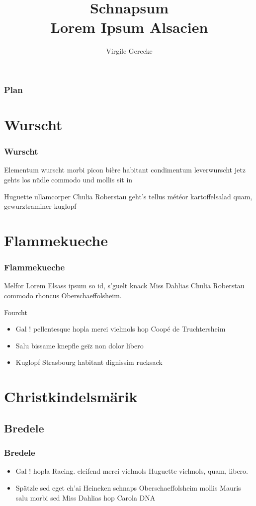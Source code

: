 \documentclass{beamer}
\title{Schnapsum\\Lorem Ipsum Alsacien}
\author{Virgile Gerecke}
\begin{document}
\frame{\titlepage}

\section[Plan]{}
\begin{frame}
\frametitle{Plan}
\tableofcontents
\end{frame}

\section{Wurscht}
\begin{frame}
\frametitle{Wurscht}
Elementum wurscht morbi picon bière habitant condimentum leverwurscht jetz gehts los nüdle commodo und mollis sit in

Huguette ullamcorper Chulia Roberstau geht's tellus météor kartoffelsalad quam, gewurztraminer kuglopf
\end{frame}

\section{Flammekueche}

\begin{frame}
\frametitle{Flammekueche}

\begin{beamerboxesrounded}[upper=sidebar,shadow=true]{Melfor}
Lorem Elsass ipsum so id, s'guelt knack Miss Dahlias Chulia Roberstau commodo rhoncus Oberschaeffolsheim.
\end{beamerboxesrounded}
\begin{beamerboxesrounded}[upper=sidebar,shadow=true]{Fourcht}
\begin{itemize}
\item Gal ! pellentesque hopla merci vielmols hop Coopé de Truchtersheim
\item Salu bissame knepfle geïz non dolor libero
\item Kuglopf Strasbourg habitant dignissim rucksack
\end{itemize}
\end{beamerboxesrounded}
\end{frame}


\section{Christkindelsmärik}

\subsection{Bredele}
\begin{frame}
\frametitle{Bredele}
\begin{itemize}
\item Gal ! hopla Racing. eleifend merci vielmols Huguette vielmols, quam, libero.
\item Spätzle sed eget ch'ai Heineken schnaps Oberschaeffolsheim mollis Mauris salu morbi sed Miss Dahlias hop Carola DNA
\end{itemize}
\end{frame}
\end{document}
